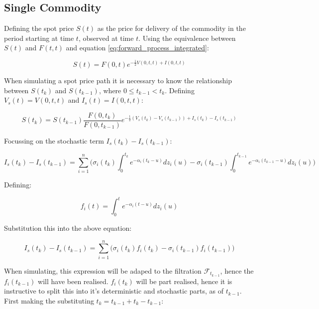 \documentclass{article}
\begin{document}
\subsection{Single Commodity}
Defining the spot price $S(t)$ as the price for delivery of the commodity in the period
starting at time $t$, observed at time $t$. Using the equivalence between $S(t)$
and $F(t, t)$ and equation \ref{eq:forward_process_integrated}:

\begin{equation}
    S(t) = F(0, t)e^{- \frac{1}{2} V(0, t, t) + I(0, t, t)}
\end{equation}

When simulating a spot price path it is necessary to know the relationship between
$S(t_k)$ and $S(t_{k-1})$, where $0 \leq t_{k-1} < t_k$. Defining $V_s(t)=V(0, t, t)$ and 
$I_s(t)=I(0, t, t)$:

\begin{equation}
    S(t_k) = S(t_{k-1}) \frac{F(0, t_k)}{F(0, t_{k-1})} e^{- \frac{1}{2} (V_s(t_k) - 
    V_s(t_{k-1})) + I_s(t_k) - I_s(t_{k-1})}
\end{equation}

Focussing on the stochastic term $I_s(t_k) - I_s(t_{k-1})$:

\begin{equation}
    I_s(t_k) - I_s(t_{k-1}) = \sum_{i=1}^n \biggl( \sigma_i(t_k) 
    \int_0^{t_k} e^{-\alpha_i(t_k-u)} dz_i(u) - \sigma_i(t_{k-1}) 
    \int_0^{t_{k-1}} e^{-\alpha_i(t_{k-1}-u)} dz_i(u) \biggr)
\end{equation}

Defining:

\begin{equation}
    f_i(t) = \int_0^{t} e^{-\alpha_i(t-u)} dz_i(u)
\end{equation}

Substitution this into the above equation:

\begin{equation}
    I_s(t_k) - I_s(t_{k-1}) = \sum_{i=1}^n \biggl( \sigma_i(t_k) 
    f_i(t_k) - \sigma_i(t_{k-1}) f_i(t_{k-1}) \biggr)
\end{equation}


When simulating, this expression will be adaped to the filtration $\mathcal{F}_{t_{k-1}}$, hence the
$f_i(t_{k-1})$ will have been realised. $f_i(t_k)$ will be part realised, hence it is instructive
to split this into it's deterministic and stochastic parts, as of $t_{k-1}$. First making the
substituting $t_k = t_{k-1} + t_k - t_{k-1}$:
\end{document}
